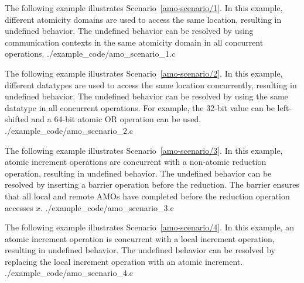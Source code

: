 \cexample
    {
      The following \CorCpp example illustrates Scenario~\ref{amo-scenario/1}.
      In this example, different atomicity domains are used to access
      the same location, resulting in undefined behavior.
      The undefined behavior can be resolved by using communication
      contexts in the same atomicity domain in all concurrent operations.
    } {./example_code/amo_scenario_1.c}

\cexample
    {The following \CorCpp example illustrates Scenario~\ref{amo-scenario/2}.  In this example,
    different datatypes are used to access the same location concurrently,
    resulting in undefined behavior.  The undefined behavior can be resolved by
    using the same datatype in all concurrent operations.  For example, the
    32-bit value can be left-shifted and a 64-bit atomic OR operation can be
    used.}
    {./example_code/amo_scenario_2.c}

\cexample
    {The following \CorCpp example illustrates Scenario~\ref{amo-scenario/3}.  In this example,
    atomic increment operations are concurrent with a non-atomic reduction
    operation, resulting in undefined behavior.  The undefined behavior can be
    resolved by inserting a barrier operation before the reduction.  The
    barrier ensures that all local and remote AMOs have completed before the
    reduction operation accesses $x$.}
    {./example_code/amo_scenario_3.c}

\cexample
    {The following \CorCpp example illustrates Scenario~\ref{amo-scenario/4}.  In this example, an
    \openshmem atomic increment operation is concurrent with a local increment
    operation, resulting in undefined behavior.  The undefined behavior can be
    resolved by replacing the local increment operation with an \openshmem
    atomic increment.}
    {./example_code/amo_scenario_4.c}

